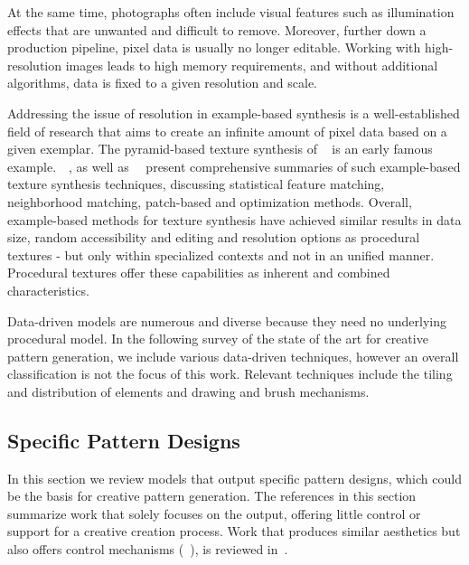 At the same time, photographs often include visual features such as illumination effects that are unwanted and difficult to remove. Moreover, further down a production pipeline, pixel data is usually no longer editable. Working with high-resolution images leads to high memory requirements, and without additional algorithms, data is fixed to a given resolution and scale.

Addressing the issue of resolution in example-based synthesis is a well-established field of research that aims to create an infinite amount of pixel data based on a given exemplar. The pyramid-based texture synthesis of \citeauthor*{heeger_1995_pbt}~\cite{heeger_1995_pbt} is an early famous example.~\citeauthor*{wei_2009_seb}~\cite{wei_2009_seb}, as well as~\citeauthor*{barnes_2017_aso}~\cite{barnes_2017_aso} present comprehensive summaries of such example-based texture synthesis techniques, discussing statistical feature matching, neighborhood matching, patch-based and optimization methods. Overall, example-based methods for texture synthesis have achieved similar results in data size, random accessibility and editing and resolution options as procedural textures - but only within specialized contexts and not in an unified manner. Procedural textures offer these capabilities as inherent and combined characteristics.

Data-driven models are numerous and diverse because they need no underlying procedural model. In the following survey of the state of the art for creative pattern generation, we include various data-driven techniques, however an overall classification is not the focus of this work. Relevant techniques include the tiling and distribution of elements and drawing and brush mechanisms.


\subsection{Specific Pattern Designs}
\label{subsec:specific_pattern_designs}

In this section we review models that output specific pattern designs, which could be the basis for creative pattern generation. The references in this section summarize work that solely focuses on the output, offering little control or support for a creative creation process. Work that produces similar aesthetics but also offers control mechanisms (\eg~\cite{wong_1998_cgf,yu_2012_ans,zehnder_2016_dso}), is reviewed in~.


